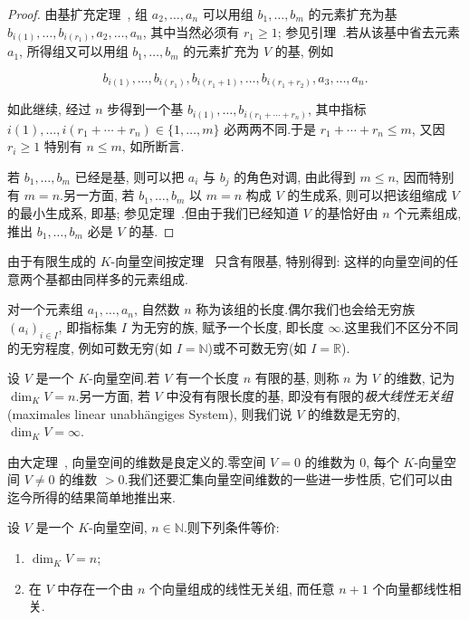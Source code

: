 \begin{proof}
由基扩充定理~, 组 $a_2, \ldots, a_n$ 可以用组 $b_1, \ldots, b_m$ 的元素扩充为基
$b_{i(1)}, \ldots, b_{i(r_1)}, a_2, \ldots, a_n$, 其中当然必须有 $r_1 \geq 1$; 参见引理~.若从该基中省去元素 $a_1$, 所得组又可以用组 $b_1, \ldots, b_m$ 的元素扩充为 $V$ 的基, 例如

\[
b_{i(1)}, \ldots, b_{i(r_1)}, b_{i(r_1 + 1)}, \ldots, b_{i(r_1 + r_2)}, a_3, \ldots, a_n\text{.}
\]

如此继续, 经过 $n$ 步得到一个基 $b_{i(1)}, \ldots, b_{i(r_1 + \cdots + r_n)}$, 其中指标 $i(1), \ldots, i(r_1 + \cdots + r_n) \in \{1, \ldots, m\}$ 必两两不同.于是 $r_1 + \cdots + r_n \leq m$, 又因 $r_i \geq 1$ 特别有 $n \leq m$, 如所断言.

若 $b_1, \ldots, b_m$ 已经是基, 则可以把 $a_i$ 与 $b_j$ 的角色对调, 由此得到 $m \leq n$, 因而特别有 $m = n$.另一方面, 若 $b_1, \ldots, b_m$ 以 $m = n$ 构成 $V$ 的生成系, 则可以把该组缩成 $V$ 的最小生成系, 即基; 参见定理~.但由于我们已经知道 $V$ 的基恰好由 $n$ 个元素组成, 推出 $b_1, \ldots, b_m$ 必是 $V$ 的基.
\end{proof}

由于有限生成的 $K$-向量空间按定理~ 只含有限基, 特别得到: 这样的向量空间的任意两个基都由同样多的元素组成.

对一个元素组 $a_1, \ldots, a_n$, 自然数 $n$ 称为该组的长度.偶尔我们也会给无穷族 $(a_i)_{i \in I}$, 即指标集 $I$ 为无穷的族, 赋予一个长度, 即长度 $\infty$.这里我们不区分不同的无穷程度, 例如可数无穷(如 $I = \mathbb{N}$)或不可数无穷(如 $I = \mathbb{R}$).

\begin{definition}[维数]\label{def:1.5.10}
设 $V$ 是一个 $K$-向量空间.若 $V$ 有一个长度 $n$ 有限的基, 则称 $n$ 为 $V$ 的维数, 记为 $\dim_K V = n$.另一方面, 若 $V$ 中没有有限长度的基, 即没有有限的\emph{极大线性无关组}(\textup{maximales linear unabhängiges System}), 则我们说 $V$ 的维数是无穷的, $\dim_K V = \infty$.
\end{definition}

由大定理~, 向量空间的维数是良定义的.零空间 $V = 0$ 的维数为 $0$, 每个 $K$-向量空间 $V \neq 0$ 的维数 $> 0$.我们还要汇集向量空间维数的一些进一步性质, 它们可以由迄今所得的结果简单地推出来.

\begin{corollary}[维数的刻画]\label{cor:1.5.11}
设 $V$ 是一个 $K$-向量空间, $n \in \mathbb{N}$.则下列条件等价:
\begin{enumerate}
\item[(i)] $\dim_K V = n$;
\item[(ii)] 在 $V$ 中存在一个由 $n$ 个向量组成的线性无关组, 而任意 $n + 1$ 个向量都线性相关.
\end{enumerate}
\end{corollary}

